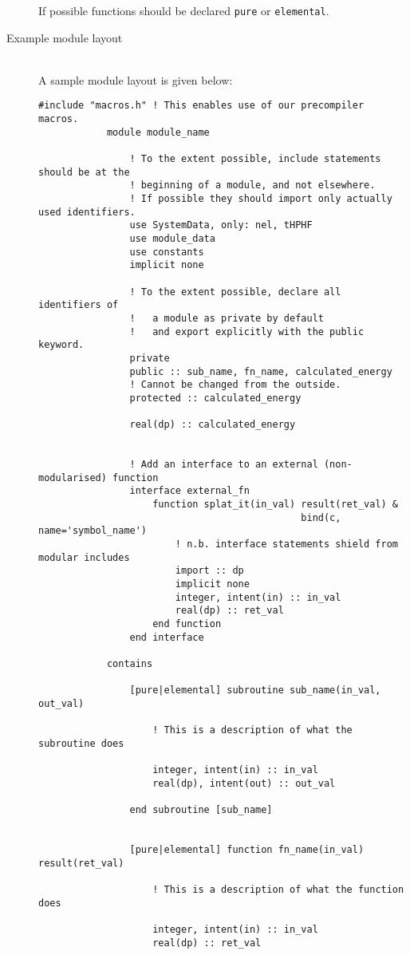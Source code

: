 \documentclass[a4paper,notitlepage,dvipsnames]{scrreprt}
\newcommand\headitem[1]{\needspace{1.5\baselineskip}\item[{\boldmath #1 \nopagebreak}] \hfill \\ \nopagebreak}
\let\code\lstinline
\begin{document}
\begin{description}
        If possible functions should be declared \code{pure}
        or \code{elemental}.



	\headitem{Example module layout}
		A sample module layout is given below:
		\begin{lstlisting}[gobble=12]
            #include "macros.h" ! This enables use of our precompiler macros.
            module module_name

            	! To the extent possible, include statements should be at the
                ! beginning of a module, and not elsewhere.
                ! If possible they should import only actually used identifiers.
            	use SystemData, only: nel, tHPHF
            	use module_data
            	use constants
            	implicit none

                ! To the extent possible, declare all identifiers of
                !   a module as private by default
                !   and export explicitly with the public keyword.
                private
                public :: sub_name, fn_name, calculated_energy
                ! Cannot be changed from the outside.
                protected :: calculated_energy

                real(dp) :: calculated_energy


                ! Add an interface to an external (non-modularised) function
            	interface external_fn
            	    function splat_it(in_val) result(ret_val) &
											  bind(c, name='symbol_name')
            		    ! n.b. interface statements shield from modular includes
            			import :: dp
            			implicit none
            			integer, intent(in) :: in_val
            			real(dp) :: ret_val
            		end function
            	end interface

            contains

            	[pure|elemental] subroutine sub_name(in_val, out_val)

            		! This is a description of what the subroutine does

            		integer, intent(in) :: in_val
            		real(dp), intent(out) :: out_val

            	end subroutine [sub_name]


            	[pure|elemental] function fn_name(in_val) result(ret_val)

            		! This is a description of what the function does

            		integer, intent(in) :: in_val
            		real(dp) :: ret_val


\end{lstlisting}
\end{description}
\end{document}
